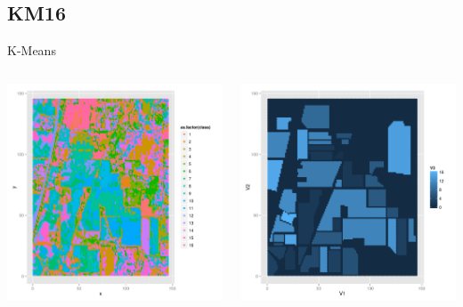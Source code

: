 \documentclass[11pt]{beamer}
\begin{document}
\subsection{KM16}
\begin{frame}{K-Means}
\begin{columns}[T]
\begin{column}{.48\textwidth}
\includegraphics[scale=.3]{km16.png}
\end{column}
\hfill
\begin{column}{.48\textwidth}
\includegraphics[scale=.3]{gt.png}
\end{column}
\end{columns}
\end{frame}
\end{document}
